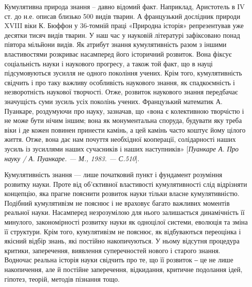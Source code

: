 Кумулятивна природа знання – давно відомий факт. Наприклад, Аристотель
в IV ст. до н.е. описав близько 500 видів тварин. А французький дослідник
природи XVIII віки К. Бюффон у 36-томній праці «Природна історія»
репрезентував уже десятки тисяч видів тварин. У наш час у науковій літературі
зафіксовано понад півтора мільйони видів. Як атрибут знання кумулятивність
разом з іншими властивостями розкриває насамперед його історичний
розвиток. Вона фіксує соціальність науки і наукового прогресу, а також той
факт, що в науці підсумовуються зусилля не одного покоління учених. Крім
того, кумулятивність свідчить і про таку важливу особливість наукового
знання, як спадкоємність і незворотність наукової творчості. Отже, розвиток
наукового знання передбачає значущість суми зусиль усіх поколінь учених.
Французький математик А. Пуанкаре, роздумуючи про науку, зазначав, що
«вона є колективною творчістю і не може бути нічим іншим; вона як
монументальна споруда, будувати яку треба віки і де кожен повинен принести
камінь, а цей камінь часто коштує йому цілого життя. Отже, вона дає нам
почуття необхідної кооперації, солідарності наших зусиль із зусиллями наших
сучасників і наших наступників» [\textit{Пуанкаре А. Про науку / А. Пуанкаре. --- М.,
1983. --- С.510}].

Кумулятивність знання --- лише початковий пункт і фундамент розуміння
розвитку науки. Проте від об’єктивної властивості кумулятивності слід
відрізняти концепцію, яка прагне пояснити розвиток науки тільки власне
кумулятивністю. Подібний кумулятивізм не пояснює і не враховує багато
важливих моментів реальної науки. Насамперед незрозумілою для нього
залишається динамічність її минулого, закономірності розвитку науки як
одноцілої системи, еволюція та зміна її структури. Крім того, кумулятивізм не
пояснює, як відбуваються переоцінка і якісний відбір знань, які постійно
накопичуються. У ньому відсутня процедура критики, заперечення, виявлення
суперечностей нового і старого знання. Водночас реальна історія науки
свідчить про те, що її розвиток ‒ це не лише накопичення, але й постійне
заперечення, відкидання, критичне подолання ідей, гіпотез, теорій, методів
пізнання тощо.

